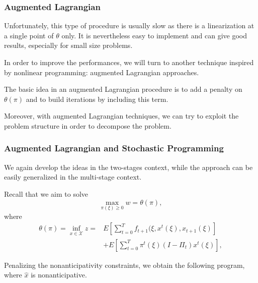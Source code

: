 \documentclass[french]{beamer}
\begin{document}
\begin{frame}
\frametitle{Augmented Lagrangian}

Unfortunately, this type of procedure is usually slow as there is a linearization at a single point of $\theta$ only.
It is nevertheless easy to implement and can give good results, especially for small size problems.

\mbox{}

In order to improve the performances, we will turn to another technique inspired by nonlinear programming: {\blue augmented Lagrangian} approaches.

\mbox{}

The basic idea in an augmented Lagrangian procedure is to add a penalty on $\theta(\pi)$ and to build iterations by including this term.

\mbox{}

Moreover, with augmented Lagrangian techniques, we can try to exploit the problem structure in order to decompose the problem.

\end{frame}






\begin{frame}
\frametitle{Augmented Lagrangian and Stochastic Programming}

We again develop the ideas in the two-stages context, while the approach can be easily generalized in the multi-stage context.

\mbox{}

Recall that we aim to solve
\[
\max_{\pi(\xi) \geq 0} w = \theta(\pi),
\]
where
\begin{align*}
\theta(\pi) = \inf_{x \in \mathcal{X}} z = & 
E\left[\sum_{t = 0}^T f_{t+1} (\xi, x^t(\xi), x_{t+1}(\xi) \right] \\
& + E\left[\sum_{t = 0}^T \pi^t(\xi)(I-\Pi_t)x^t(\xi) \right],
\end{align*}

Penalizing the nonanticipativity constraints, we obtain the following program, where $\hat{x}$ is nonanticipative.

\end{frame}
\end{document}
